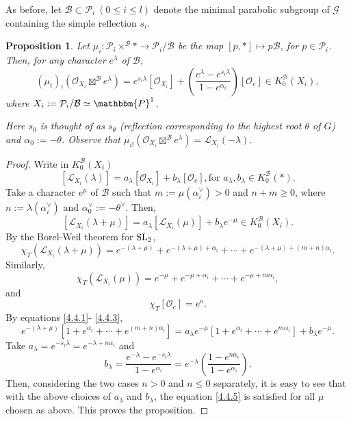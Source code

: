 \documentclass{article}
\newtheorem{proposition}[theorem]{Proposition}
\def\L{\mathcal{L}}
\def\G{\mathcal{G}}
\def\P{\mathcal{P}}
\def\B{\mathcal{B}}
\def\mathbb{\mathbbm}
\def\SL{\rm{SL}}
\begin{document}
As before, let $\B\subset \P_i ~(0\leq i \leq l)$ denote the minimal parabolic subgroup of $\G$ containing the simple reflection $s_i$. 
\begin{proposition} \label{prop4.4}
Let $\mu_i:\P_i\times^\B * \rightarrow\P_i/\B$ be the map $[p,*]\mapsto p\B$,  for $p\in \P_i$. Then, for any character $e^\lambda$ of $\B$,
$$
(\mu_i)_! \left(\mathcal{O}_{X_i}\boxtimes^\B e^\lambda\right)= e^{s_i\lambda}\left[\mathcal{O}_{X_i}\right]+ \left(\frac{e^\lambda- e^{s_i\lambda}}{1-e^{\alpha_i}}\right)\left[\mathcal{O}_{e}\right]\in K_0^\B(X_i),
$$
where $X_i:=\P_i/\B \simeq \mathbb{P}^1$.

Here $s_0$ is thought of as $s_\theta$ (reflection corresponding to the highest root $\theta$ of $G$) and $\alpha_0:=-\theta$. Observe that $\mu_{i!} \left(\mathcal{O}_{X_i}\boxtimes^\B e^\lambda\right)= \L_{X_i}(-\lambda)$. 
\end{proposition}

\begin{proof}
Write in $K_0^\B(X_i)$ 
$$
\left[\L_{X_i}(\lambda)\right] = a_\lambda\left[\mathcal{O}_{X_i} \right] + b_\lambda \left[\mathcal{O}_e\right]
,\mbox{for } a_\lambda,b_\lambda \in K_0^\B (*).
$$
Take a character $e^\mu$ of $\B$ such that $m:= \mu(\alpha_i^\vee)>0$ and $n+m\geq 0$, where $n:=\lambda \left(\alpha_i^\vee\right)$ and $\alpha_0^\vee:=-\theta^\vee$. Then, 
\begin{equation}\label{4.4.1}
 \left[\L_{X_i}(\lambda+\mu)\right] = a_\lambda\left[\L_{X_i}(\mu) \right] + b_\lambda e^{-\mu} \in K_0^\B(X_i).
\end{equation}
By the Borel-Weil theorem for $\SL_2$,
\begin{equation}\label{4.4.2}
\chi_T\left(\mathcal{L}_{X_i}(\lambda+\mu)\right) =e^{-(\lambda +\mu)}+e^{-(\lambda+\mu)+\alpha_i} +\cdots +e^{-(\lambda+\mu)+(m+n)\alpha_i}.
\end{equation}
Similarly, 
\begin{equation}\label{4.4.3}
\chi_T(\L _{X_i}(\mu))=e^{-\mu} +e^{-\mu+\alpha_i}+\cdots + e^{-\mu+m\alpha_i},
\end{equation}
and 
\begin{equation}\label{4.4.4}
\chi_T[\mathcal{O}_e]=e^o.
\end{equation}
By equations \eqref{4.4.1}- \eqref{4.4.3},
\begin{equation}\label{4.4.5}
e^{-\left(\lambda+\mu\right)}\left[1+e^{\alpha_i}+\cdots + e^{\left(m+n\right)\alpha_i}\right]= a_\lambda e^{-\mu} \left[1+ e^{\alpha_i}+\cdots + e^{m\alpha_i}\right]+ b_\lambda e^{-\mu}.
\end{equation}
Take $a_\lambda=e^{-s_i\lambda}=e^{-\lambda+n\alpha_i}$ and 
$$
b_\lambda = \frac{e^{-\lambda}-e^{-s_i\lambda}}{1-e^{\alpha_i}} = e^{-\lambda}\left(\frac{1-e^{n\alpha_i}}{1-e^{\alpha_i}}\right).
$$
Then, considering the two cases $n>0$ and $n\leq0$ separately, it is easy to see that with the above choices of $a_\lambda$ and $b_\lambda$, the equation \eqref{4.4.5} is satisfied for all $\mu$ chosen as above. This proves the proposition. 
\end{proof}
\end{document}
